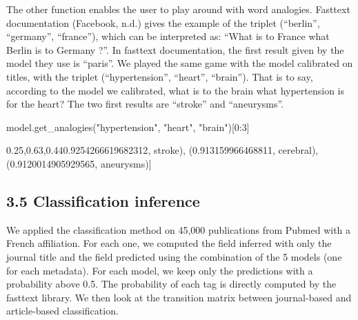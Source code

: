 \documentclass[
]{article}
\newenvironment{Shaded}{}{}
\newcommand{\DecValTok}[1]{\textcolor[rgb]{0.25,0.63,0.44}{#1}}
\newcommand{\FloatTok}[1]{\textcolor[rgb]{0.25,0.63,0.44}{#1}}
\newcommand{\NormalTok}[1]{#1}
\newcommand{\OperatorTok}[1]{\textcolor[rgb]{0.40,0.40,0.40}{#1}}
\newcommand{\StringTok}[1]{\textcolor[rgb]{0.25,0.44,0.63}{#1}}
\begin{document}
The other function enables the user to play around with word analogies.
Fasttext documentation (Facebook, n.d.) gives the example of the triplet
(``berlin'', ``germany'', ``france''), which can be interpreted as:
``What is to France what Berlin is to Germany ?''. In fasttext
documentation, the first result given by the model they use is
``paris''. We played the same game with the model calibrated on titles,
with the triplet (``hypertension'', ``heart'', ``brain''). That is to
say, according to the model we calibrated, what is to the brain what
hypertension is for the heart? The two first results are ``stroke'' and
``aneurysms''.

\begin{Shaded}
\begin{Highlighting}[]
\NormalTok{model.get\_analogies(}\StringTok{"hypertension"}\NormalTok{, }\StringTok{"heart"}\NormalTok{, }\StringTok{"brain"}\NormalTok{)[}\DecValTok{0}\NormalTok{:}\DecValTok{3}\NormalTok{]}
\end{Highlighting}
\end{Shaded}

\begin{Shaded}
\begin{Highlighting}[]
\NormalTok{[(}\FloatTok{0.9254266619682312}\OperatorTok{,} \StringTok{\textquotesingle{}stroke\textquotesingle{}}\NormalTok{)}\OperatorTok{,}
\NormalTok{ (}\FloatTok{0.913159966468811}\OperatorTok{,} \StringTok{\textquotesingle{}cerebral\textquotesingle{}}\NormalTok{)}\OperatorTok{,}
\NormalTok{ (}\FloatTok{0.9120014905929565}\OperatorTok{,} \StringTok{\textquotesingle{}aneurysms\textquotesingle{}}\NormalTok{)]}
\end{Highlighting}
\end{Shaded}

\hypertarget{classification-inference}{%
\subsection{3.5 Classification
inference}\label{classification-inference}}

We applied the classification method on 45,000 publications from Pubmed
with a French affiliation. For each one, we computed the field inferred
with only the journal title and the field predicted using the
combination of the 5 models (one for each metadata). For each model, we
keep only the predictions with a probability above 0.5. The probability
of each tag is directly computed by the fasttext library. We then look
at the transition matrix between journal-based and article-based
classification.
\end{document}
